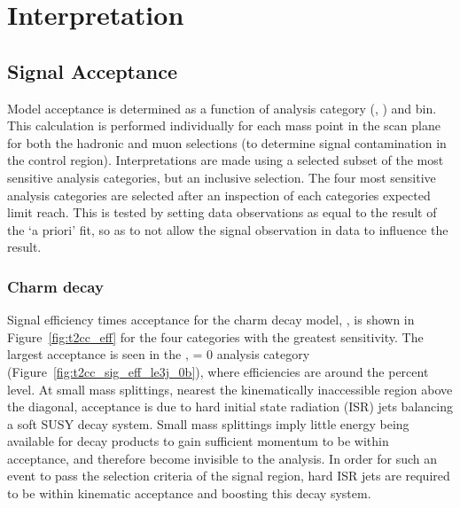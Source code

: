 \chapter{Interpretation}
\label{ch:interpretation}

\ifpdf
    \graphicspath{{Chapter9/Figs/Raster/}{Chapter9/Figs/PDF/}{Chapter9/Figs/}}
\else
    \graphicspath{{Chapter9/Figs/Vector/}{Chapter9/Figs/}}
\fi

\section{Signal Acceptance}  %
\label{sec:interpretation_acceptance}

Model acceptance is determined as a function of analysis category (\nb, \nj) and
\HT bin. This calculation is performed individually for each mass point in the
scan plane for both the hadronic and muon selections (to determine 
signal contamination in the control region). Interpretations are made using a
selected subset of the most sensitive analysis 
categories, but an inclusive \HT selection. 
The four most sensitive analysis categories are selected after an inspection of
each categories expected limit reach. This is tested by setting data observations
as equal to the result of the `a priori' fit, so as to not allow the signal
observation in data to influence the result.

\subsection{Charm decay}
\label{sec:t2cc_eff}
Signal efficiency times acceptance for the charm decay model, \Ttwocc,  is shown
in
Figure~\ref{fig:t2cc_eff} for the four categories with the greatest sensitivity.
The largest acceptance is seen in the \njlow, 
\nb= 0 analysis category (Figure~\ref{fig:t2cc_sig_eff_le3j_0b}), where efficiencies
are around the percent level. At 
small mass splittings, nearest the kinematically inaccessible region above the diagonal, 
acceptance is due to hard initial state radiation (ISR) jets balancing a soft 
SUSY decay system. Small mass splittings imply little energy being available for
decay products to gain sufficient momentum to be within acceptance, and therefore 
become invisible to the analysis. In order for such an event to pass the 
selection criteria of the signal region, hard ISR jets are required to be within
kinematic acceptance and boosting this decay system.

